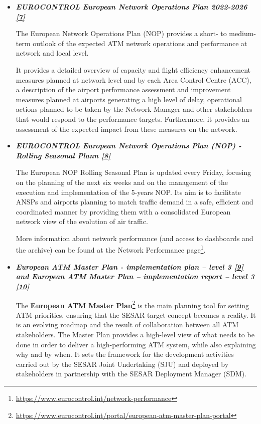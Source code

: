 \documentclass[
  11pt,
  a4paper,
]{book}
\DeclareRobustCommand{\href}[2]{#2\footnote{\url{#1}}}
\begin{document}
\begin{itemize}
\item
  \textbf{\emph{EUROCONTROL European Network Operations Plan 2022-2026
  \protect\hyperlink{ref-ectrl:nop:2022}{{[}7{]}}}}

  The European Network Operations Plan (NOP) provides a short- to
  medium-term outlook of the expected ATM network operations and
  performance at network and local level.

  It provides a detailed overview of capacity and flight efficiency
  enhancement measures planned at network level and by each Area Control
  Centre (ACC), a description of the airport performance assessment and
  improvement measures planned at airports generating a high level of
  delay, operational actions planned to be taken by the Network Manager
  and other stakeholders that would respond to the performance targets.
  Furthermore, it provides an assessment of the expected impact from
  these measures on the network.
\item
  \textbf{\emph{EUROCONTROL European Network Operations Plan (NOP) -
  Rolling Seasonal Plann
  \protect\hyperlink{ref-ectrl:nop:rsp}{{[}8{]}}}}

  The European NOP Rolling Seasonal Plan is updated every Friday,
  focusing on the planning of the next six weeks and on the management
  of the execution and implementation of the 5-years NOP. Its aim is to
  facilitate ANSPs and airports planning to match traffic demand in a
  safe, efficient and coordinated manner by providing them with a
  consolidated European network view of the evolution of air traffic.

  More information about network performance (and access to dashboards
  and the archive) can be found at the
  \href{https://www.eurocontrol.int/network-performance}{Network
  Performance page}.
\item
  \textbf{\emph{European ATM Master Plan - implementation plan -- level
  3 \protect\hyperlink{ref-ectrl:mp:ip}{{[}9{]}} and European ATM Master
  Plan -- implementation report -- level 3
  \protect\hyperlink{ref-ectrl:mp:ir}{{[}10{]}}}}

  The
  \href{https://www.eurocontrol.int/portal/european-atm-master-plan-portal}{\textbf{European
  ATM Master Plan}} is the main planning tool for setting ATM
  priorities, ensuring that the SESAR target concept becomes a reality.
  It is an evolving roadmap and the result of collaboration between all
  ATM stakeholders. The Master Plan provides a high-level view of what
  needs to be done in order to deliver a high-performing ATM system,
  while also explaining why and by when. It sets the framework for the
  development activities carried out by the SESAR Joint Undertaking
  (SJU) and deployed by stakeholders in partnership with the SESAR
  Deployment Manager (SDM).


\end{itemize}
\end{document}
